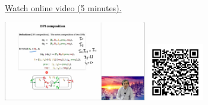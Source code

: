 
\begin{minipage}{10cm}
    \href{https://act4e-spring21.netlify.app/videos/spring2021-design:design:dpi-semicat.html}{Watch online video (5 minutes).}
        
    \href{https://act4e-spring21.netlify.app/videos/spring2021-design:design:dpi-semicat.html}{\includegraphics[height=3.5cm]{spring2021-design:design:dpi-semicat/thumbnails.jpg}}
    \href{https://act4e-spring21.netlify.app/videos/spring2021-design:design:dpi-semicat.html}{\includegraphics[height=2.5cm]{spring2021-design:design:dpi-semicat/qrcode.png}}
\end{minipage}
